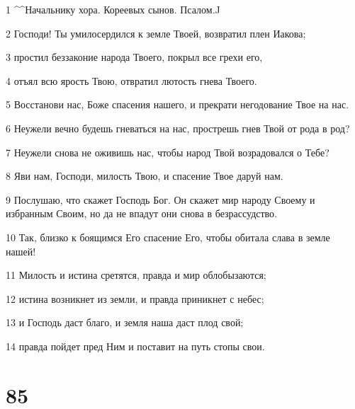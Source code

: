 \par 1 ^^Начальнику хора. Кореевых сынов. Псалом.^^
\par 2 Господи! Ты умилосердился к земле Твоей, возвратил плен Иакова;
\par 3 простил беззаконие народа Твоего, покрыл все грехи его,
\par 4 отъял всю ярость Твою, отвратил лютость гнева Твоего.
\par 5 Восстанови нас, Боже спасения нашего, и прекрати негодование Твое на нас.
\par 6 Неужели вечно будешь гневаться на нас, прострешь гнев Твой от рода в род?
\par 7 Неужели снова не оживишь нас, чтобы народ Твой возрадовался о Тебе?
\par 8 Яви нам, Господи, милость Твою, и спасение Твое даруй нам.
\par 9 Послушаю, что скажет Господь Бог. Он скажет мир народу Своему и избранным Своим, но да не впадут они снова в безрассудство.
\par 10 Так, близко к боящимся Его спасение Его, чтобы обитала слава в земле нашей!
\par 11 Милость и истина сретятся, правда и мир облобызаются;
\par 12 истина возникнет из земли, и правда приникнет с небес;
\par 13 и Господь даст благо, и земля наша даст плод свой;
\par 14 правда пойдет пред Ним и поставит на путь стопы свои.

\chapter{85}

